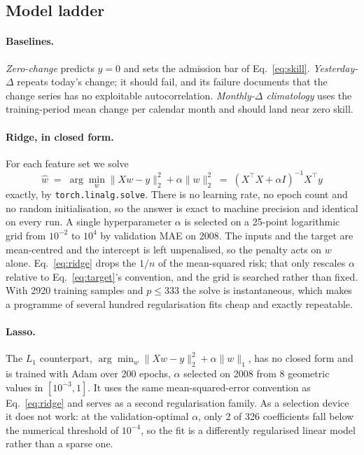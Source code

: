 \documentclass[11pt,a4paper]{article}
\begin{document}
\subsection{Model ladder}
\label{sec:ladder}

\paragraph{Baselines.} \emph{Zero-change} predicts $\hat y = 0$ and sets the admission bar of Eq.~\ref{eq:skill}. \emph{Yesterday-$\Delta$} repeats today's change; it should fail, and its failure documents that the change series has no exploitable autocorrelation. \emph{Monthly-$\Delta$ climatology} uses the training-period mean change per calendar month and should land near zero skill.

\paragraph{Ridge, in closed form.} For each feature set we solve
\begin{equation}
\hat w \;=\; \arg\min_w \lVert Xw - y\rVert_2^2 + \alpha \lVert w\rVert_2^2
\;=\; (X^{\top}X + \alpha I)^{-1} X^{\top} y
\label{eq:ridge}
\end{equation}
exactly, by \texttt{torch.linalg.solve}. There is no learning rate, no epoch count and no random initialisation, so the answer is exact to machine precision and identical on every run. A single hyperparameter $\alpha$ is selected on a 25-point logarithmic grid from $10^{-2}$ to $10^{4}$ by validation MAE on 2008. The inputs and the target are mean-centred and the intercept is left unpenalised, so the penalty acts on $w$ alone.
Eq.~\ref{eq:ridge} drops the $1/n$ of the mean-squared risk; that only rescales $\alpha$ relative to Eq.~\ref{eq:target}'s convention, and the grid is searched rather than fixed. With 2920 training samples and $p \le 333$ the solve is instantaneous, which makes a programme of several hundred regularisation fits cheap and exactly repeatable.

\paragraph{Lasso.} The $L_1$ counterpart, $\arg\min_w \lVert Xw - y\rVert_2^2 + \alpha\lVert w\rVert_1$, has no closed form and is trained with Adam over 200 epochs, $\alpha$ selected on 2008 from 8 geometric values in $[10^{-3}, 1]$. It uses the same mean-squared-error convention as Eq.~\ref{eq:ridge} and serves as a second regularisation family. As a selection device it does not work: at the validation-optimal $\alpha$, only 2 of 326 coefficients fall below the numerical threshold of $10^{-4}$, so the fit is a differently regularised linear model rather than a sparse one.
\end{document}
